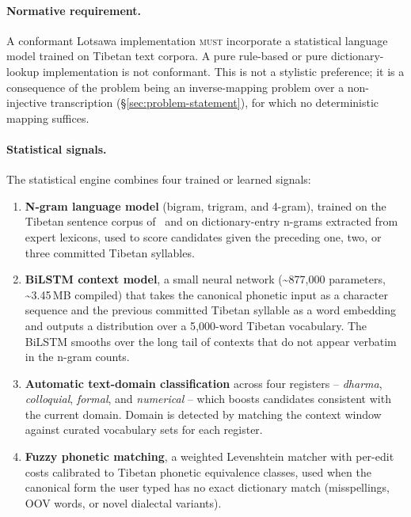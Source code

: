 \documentclass[11pt]{article}
\begin{document}
\paragraph{Normative requirement.} A conformant Lotsawa implementation \textsc{must} incorporate a statistical language model trained on Tibetan text corpora. A pure rule-based or pure dictionary-lookup implementation is not conformant. This is not a stylistic preference; it is a consequence of the problem being an inverse-mapping problem over a non-injective transcription (\S\ref{sec:problem-statement}), for which no deterministic mapping suffices.

\paragraph{Statistical signals.} The statistical engine combines four trained or learned signals:
\begin{enumerate}
\item \textbf{N-gram language model} (bigram, trigram, and 4-gram), trained on the Tibetan sentence corpus of~\citet{billingsmoore_hf} and on dictionary-entry n-grams extracted from expert lexicons, used to score candidates given the preceding one, two, or three committed Tibetan syllables.
\item \textbf{BiLSTM context model}, a small neural network (\textasciitilde 877{,}000 parameters, \textasciitilde 3.45\,MB compiled) that takes the canonical phonetic input as a character sequence and the previous committed Tibetan syllable as a word embedding and outputs a distribution over a 5{,}000-word Tibetan vocabulary. The BiLSTM smooths over the long tail of contexts that do not appear verbatim in the n-gram counts.
\item \textbf{Automatic text-domain classification} across four registers -- \emph{dharma}, \emph{colloquial}, \emph{formal}, and \emph{numerical} -- which boosts candidates consistent with the current domain. Domain is detected by matching the context window against curated vocabulary sets for each register.
\item \textbf{Fuzzy phonetic matching}, a weighted Levenshtein matcher with per-edit costs calibrated to Tibetan phonetic equivalence classes, used when the canonical form the user typed has no exact dictionary match (misspellings, OOV words, or novel dialectal variants).
\end{enumerate}
\end{document}
